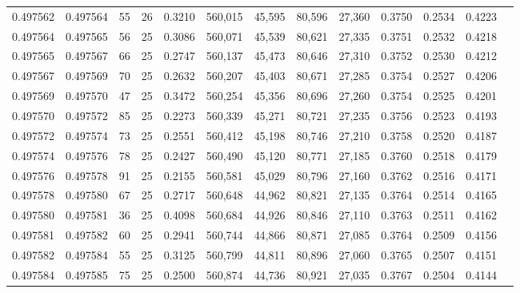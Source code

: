 \begin{tabular}{rrrrrrrrrrrrr}
0.497562 & 0.497564 &    55 &  26 &                                     0.3210 & 560,015 &  45,595 &  80,596 &  27,360 & 0.3750 & 0.2534 & 0.4223 \\
0.497564 & 0.497565 &    56 &  25 &                                     0.3086 & 560,071 &  45,539 &  80,621 &  27,335 & 0.3751 & 0.2532 & 0.4218 \\
0.497565 & 0.497567 &    66 &  25 &                                     0.2747 & 560,137 &  45,473 &  80,646 &  27,310 & 0.3752 & 0.2530 & 0.4212 \\
0.497567 & 0.497569 &    70 &  25 &                                     0.2632 & 560,207 &  45,403 &  80,671 &  27,285 & 0.3754 & 0.2527 & 0.4206 \\
0.497569 & 0.497570 &    47 &  25 &                                     0.3472 & 560,254 &  45,356 &  80,696 &  27,260 & 0.3754 & 0.2525 & 0.4201 \\
0.497570 & 0.497572 &    85 &  25 &                                     0.2273 & 560,339 &  45,271 &  80,721 &  27,235 & 0.3756 & 0.2523 & 0.4193 \\
0.497572 & 0.497574 &    73 &  25 &                                     0.2551 & 560,412 &  45,198 &  80,746 &  27,210 & 0.3758 & 0.2520 & 0.4187 \\
0.497574 & 0.497576 &    78 &  25 &                                     0.2427 & 560,490 &  45,120 &  80,771 &  27,185 & 0.3760 & 0.2518 & 0.4179 \\
0.497576 & 0.497578 &    91 &  25 &                                     0.2155 & 560,581 &  45,029 &  80,796 &  27,160 & 0.3762 & 0.2516 & 0.4171 \\
0.497578 & 0.497580 &    67 &  25 &                                     0.2717 & 560,648 &  44,962 &  80,821 &  27,135 & 0.3764 & 0.2514 & 0.4165 \\
0.497580 & 0.497581 &    36 &  25 &                                     0.4098 & 560,684 &  44,926 &  80,846 &  27,110 & 0.3763 & 0.2511 & 0.4162 \\
0.497581 & 0.497582 &    60 &  25 &                                     0.2941 & 560,744 &  44,866 &  80,871 &  27,085 & 0.3764 & 0.2509 & 0.4156 \\
0.497582 & 0.497584 &    55 &  25 &                                     0.3125 & 560,799 &  44,811 &  80,896 &  27,060 & 0.3765 & 0.2507 & 0.4151 \\
0.497584 & 0.497585 &    75 &  25 &                                     0.2500 & 560,874 &  44,736 &  80,921 &  27,035 & 0.3767 & 0.2504 & 0.4144 \\

\end{tabular}
